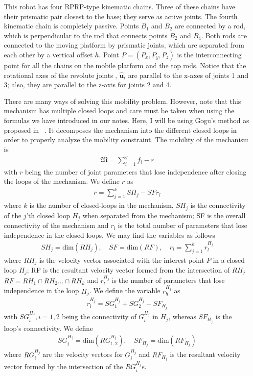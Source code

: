 \begin{solution}This robot has four RPRP-type kinematic chains. Three of these chains have their prismatic pair closest to the base; they serve as active joints. The fourth kinematic chain is completely passive. Points $B_1$ and $B_2$ are connected by a rod, which is perpendicular to the rod that connects points $B_2$ and $B_4$. Both rods are connected to the moving platform by prismatic joints, which are separated from each other by a vertical offset $h$. Point $P = (P_x,P_y, P_z)$ is the interconnecting point for all the chains on the mobile platform and the top rods. Notice that the rotational axes of the revolute joints \ie, $\bm{\hat{u}}_i$ are parallel to the x-axes of joints 1 and 3; also, they are parallel to the z-axis for joints 2 and 4. 
	
	There are many ways of solving this mobility problem. However, note that this mechanism has multiple closed loops and care must be taken when using the formulas we have introduced in our notes. Here, I will be using Gogu's method as proposed in ~\cite{Gogu}. It decomposes the mechanism into the different closed loops in order to properly analyze the mobility constraint. The mobility of the mechanism is 
	\begin{align}
	\mathfrak{M} = \sum_{i=1}^{g} f_i - r
	\end{align}
	with $r$ being the number of joint parameters that lose independence after closing the loops of the mechanism. We define $r$ as 
	\begin{align}
	r = \sum_{j=1}^{k}SH_j - SF  r_l
	\end{align}
	where $k$ is the number of closed-loops in the mechanism, $SH_j$ is the connectivity of the $j$'th closed loop $H_j$ when separated from  the mechanism; SF is the overall connectivity of the mechanism and $r_l$ is the total number of parameters that lose independence in the closed loops. We may find the variables as follows
	\begin{align}
	SH_j = \text{dim}(RH_j), \quad SF = \text{dim} (RF), \quad r_l = \sum_{j=1}^{k} r_l^{H_j}
	\end{align}
	where $RH_j$ is the velocity vector associated with the interest point $P$ in a closed loop $H_j$; RF is the resultant velocity vector formed from the intersection of $RH_j$ \ie $RF = RH_1 \cap RH_2 \ldots \cap RH_k$ and $r_l^{H_j}$ is the number of parameters that lose independence in the loop $H_j$. We define the variable $r_h^{H_j}$ as 
	\begin{align}
	r_l^{H_j} = SG_1^{H_j} + SG_2^{H_j} - SF_{H_j} 
	\end{align}
	with $SG_i^{H_j}, i = 1,2$ being the connectivity of $G_i^{H_j}$ in $H_j$, whereas $SF_{H_j}$ is the loop's connectivity. We define
	\begin{align}
	SG_i^{H_j} = \text{dim} \left(RG_{1,2}^{H_j}\right), \quad SF_{H_j} = \text{dim}\left(RF_{H_j}\right)
	\end{align}
	where $RG_i^{H_j}$ are the velocity vectors for $G_i^{H_j}$ and $RF_{H_j}$ is the resultant velocity vector formed by the intersection of the $RG_i^{H_j}$s.
	

\end{solution}
